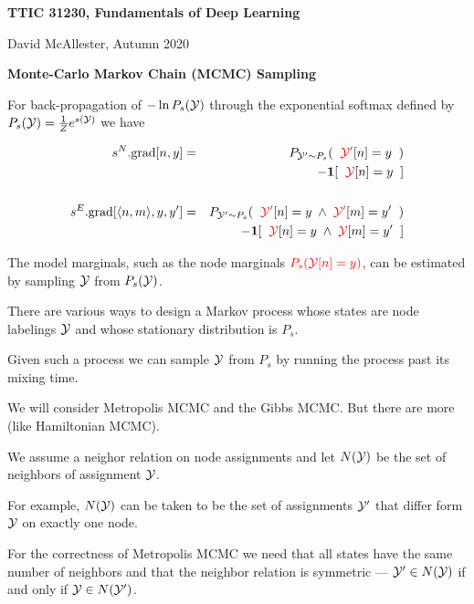 




{\Huge

  \centerline{\bf TTIC 31230, Fundamentals of Deep Learning}
  \bigskip
  \centerline{David McAllester, Autumn 2020}
  \vfill
  \vfill
  \centerline{\bf Monte-Carlo Markov Chain (MCMC) Sampling}
\vfill
\vfill
\vfill


For back-propagation of $- \ln P_s({\cal Y})$ through the exponential softmax defined by $P_s({\cal Y}) = \frac{1}{Z} e^{s({\cal Y})}$ we have

\vfill
\begin{eqnarray*}
    s^N.\mathrm{grad}[n,y] & = &   P_{{\cal Y}' \sim P_s}(\;\;{\color{red} {\cal Y}'}[n] = y\;\;) \\
    & & - \mathbf{1}[\;\;{\color{red} {\cal Y}}[n] = y\;\;] \\
    \\
    s^E.\mathrm{grad}[{\mbox{$\langle n,m\rangle$}},y,y'] & = &  P_{{\cal Y}' \sim P_s}(\;\;{\color{red} {\cal Y}'}[n] = y \; \wedge \; {\color{red} {\cal Y}'}[m] = y'\;\;) \\
    & & - \mathbf{1}[\;\;{\color{red} {\cal Y}}[n] = y\; \wedge \; {\color{red} {\cal Y}}[m] = y'\;\;]
\end{eqnarray*}

The model marginals, such as the node marginals
 ${\color{red} P_s({\cal Y}[n]=y)}$, can be estimated by sampling ${\cal Y}$ from $P_s({\cal Y})$.

\vfill
There are various ways to design a Markov process whose states are node labelings ${\cal Y}$ and whose stationary distribution is $P_s$.

\vfill
Given such a process we can sample ${\cal Y}$ from $P_s$ by running the process past its mixing time.

\vfill
We will consider Metropolis MCMC and the Gibbs MCMC.  But there are more (like Hamiltonian MCMC).


We assume a neighor relation on node assignments and let $N({\cal Y})$ be the set of neighbors of assignment ${\cal Y}$.

\vfill
For example, $N({\cal Y})$ can be taken to be the set of assignments ${\cal Y}'$ that differ form ${\cal Y}$ on exactly one node.

\vfill
For the correctness of Metropolis MCMC we need that all states have the same number of neighbors and that the neighbor relation is symmetric ---
${\cal Y}' \in N({\cal Y})$ if and only if ${\cal Y} \in N({\cal Y}')$.

}
